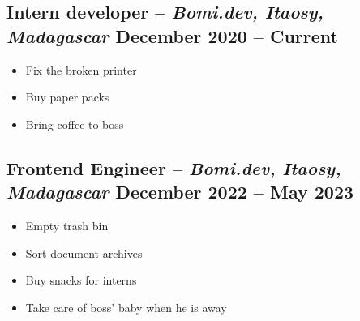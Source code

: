 


\subsection*{\textbf{Intern developer} -- \textit{Bomi.dev, Itaosy, Madagascar} \hfill December 2020 -- Current}
\begin{itemize}


    \item Fix the broken printer

    \item Buy paper packs

    \item Bring coffee to boss

\end{itemize}


\subsection*{\textbf{Frontend Engineer} -- \textit{Bomi.dev, Itaosy, Madagascar} \hfill December 2022 -- May 2023}
\begin{itemize}


    \item Empty trash bin

    \item Sort document archives

    \item Buy snacks for interns

    \item Take care of boss' baby when he is away

\end{itemize}


